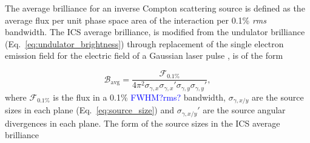 \documentclass[../main.tex]{subfiles}
\begin{document}
The average brilliance for an inverse Compton scattering source is defined as the average flux per unit phase space area of the interaction per 0.1\% \textit{rms} bandwidth. The ICS average brilliance, is modified from the undulator brilliance (Eq.~\ref{eq:undulator_brightness}) through replacement of the single electron emission field for the electric field of a Gaussian laser pulse \cite{krafft2010compton,deitrick2018high}, is of the form   

\begin{equation}
\mathcal{B}_{\mathrm{avg}} = \frac{\mathcal{F}_{0.1\%}}{4\pi^{2}\sigma_{\gamma,x}\sigma_{\gamma,x}'\sigma_{\gamma,y}\sigma_{\gamma,y}'},
\label{eq:average_brightness}
\end{equation}
where $\mathcal{F}_{0.1\%}$ is the flux in a 0.1\%  \textcolor{blue}{FWHM?rms?} bandwidth, $\sigma_{\gamma,x/y}$ are the source sizes in each plane (Eq.~\ref{eq:source_size}) and $\sigma_{\gamma,x/y}'$ are the source angular divergences in each plane. The form of the source sizes in the ICS average brilliance 
\end{document}
